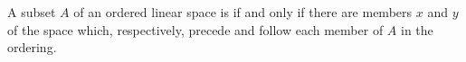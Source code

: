 A subset $A$ of an ordered linear space is  if and only if there are members $x$ and $y$ of the space which, respectively, precede and follow each member of $A$ in the ordering.
